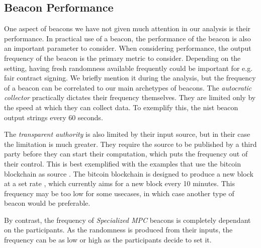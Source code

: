 \subsection{Beacon Performance}
One aspect of beacons we have not given much attention in our analysis is their performance. In practical use of a beacon, the performance of the beacon is also an important parameter to consider. 
When considering performance, the output frequency of the beacon is the primary metric to consider. Depending on the setting, having fresh randomness available frequently could be important for e.g. fair contract signing\cite{rabin1983transaction}. We briefly mention it during the analysis, but the frequency of a beacon can be correlated to our main archetypes of beacons.  
The \emph{autocratic collector} practically dictates their frequency themselves. They are limited only by the speed at which they can collect data. To exemplify this, the \gls{nist} beacon output strings every 60 seconds\cite{nistbeacon}.

The \emph{transparent authority} is also limited by their input source, but in their case the limitation is much greater. They require the source to be published by a third party before they can start their computation, which puts the frequency out of their control. This is best exemplified with the examples that use the bitcoin blockchain as source \cite{bonneau2015bitcoin, bentov2016bitcoin, bunz2017proofsof}. The bitcoin blockchain is designed to produce a new block at a set rate \cite{nakamoto2008bitcoin}, which currently aims for a new block every 10 minutes. This frequency may be too low for some usecases, in which case another type of beacon would be preferable. 

By contrast, the frequency of \emph{Specialized MPC} beacons is completely dependant on the participants. As the randomness is produced from their inputs, the frequency can be as low or high as the participants decide to set it.
